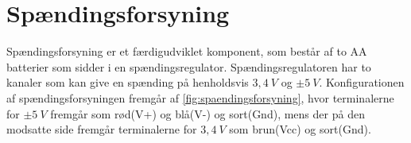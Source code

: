 \section{Spændingsforsyning}
Spændingsforsyning er et færdigudviklet komponent, som består af to AA batterier som sidder i en spændingsregulator. Spændingsregulatoren har to kanaler som kan give en spænding på henholdsvis $3,4~V$ og $\pm 5~V$. Konfigurationen af spændingsforsyningen fremgår af \autoref{fig:spaendingsforsyning}, hvor terminalerne for $\pm 5~V$ fremgår som rød(V+) og blå(V-) og sort(Gnd), mens der på den modsatte side fremgår terminalerne for $3,4~V$ som brun(Vcc) og sort(Gnd). 